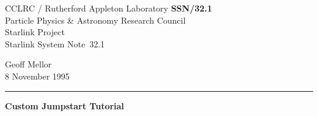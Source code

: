 \documentclass[11pt]{article}
\newcommand{\stardoccategory}  {Starlink System Note}
\newcommand{\stardocinitials}  {SSN}
\newcommand{\stardocnumber}    {32.1}
\newcommand{\stardocauthors}   {Geoff Mellor}
\newcommand{\stardocdate}      {8 November 1995}
\newcommand{\stardoctitle}     {Custom Jumpstart Tutorial}
\newcommand{\stardocname}{\stardocinitials /\stardocnumber}
\newenvironment{latexonly}{}{}
\begin{document}
\thispagestyle{empty}

\begin{latexonly}
   CCLRC / {\sc Rutherford Appleton Laboratory} \hfill {\bf \stardocname}\\
   {\large Particle Physics \& Astronomy Research Council}\\
   {\large Starlink Project\\}
   {\large \stardoccategory\ \stardocnumber}
   \begin{flushright}
   \stardocauthors\\
   \stardocdate
   \end{flushright}
   \vspace{-4mm}
   \rule{\textwidth}{0.5mm}
   \vspace{5mm}
   \begin{center}
   {\Large\bf \stardoctitle}
   \end{center}
   \vspace{5mm}

\end{latexonly}
\end{document}
